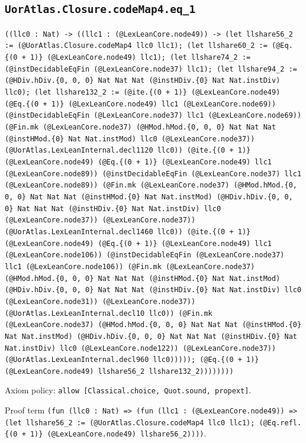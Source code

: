 \documentclass[11pt]{article}
\begin{document}
\subsection*{\texttt{UorAtlas.Closure.codeMap4.eq\_1}}
\noindent\texttt{((llc0 : Nat) -> ((llc1 : (@LexLeanCore.node49)) -> (let llshare56\_2 := (@UorAtlas.Closure.codeMap4 llc0 llc1); (let llshare60\_2 := (@Eq.\{(0 + 1)\} (@LexLeanCore.node49) llc1); (let llshare74\_2 := (@instDecidableEqFin (@LexLeanCore.node37) llc1); (let llshare94\_2 := (@HDiv.hDiv.\{0, 0, 0\} Nat Nat Nat (@instHDiv.\{0\} Nat Nat.instDiv) llc0); (let llshare132\_2 := (@ite.\{(0 + 1)\} (@LexLeanCore.node49) (@Eq.\{(0 + 1)\} (@LexLeanCore.node49) llc1 (@LexLeanCore.node69)) (@instDecidableEqFin (@LexLeanCore.node37) llc1 (@LexLeanCore.node69)) (@Fin.mk (@LexLeanCore.node37) (@HMod.hMod.\{0, 0, 0\} Nat Nat Nat (@instHMod.\{0\} Nat Nat.instMod) llc0 (@LexLeanCore.node37)) (@UorAtlas.LexLeanInternal.decl1120 llc0)) (@ite.\{(0 + 1)\} (@LexLeanCore.node49) (@Eq.\{(0 + 1)\} (@LexLeanCore.node49) llc1 (@LexLeanCore.node89)) (@instDecidableEqFin (@LexLeanCore.node37) llc1 (@LexLeanCore.node89)) (@Fin.mk (@LexLeanCore.node37) (@HMod.hMod.\{0, 0, 0\} Nat Nat Nat (@instHMod.\{0\} Nat Nat.instMod) (@HDiv.hDiv.\{0, 0, 0\} Nat Nat Nat (@instHDiv.\{0\} Nat Nat.instDiv) llc0 (@LexLeanCore.node37)) (@LexLeanCore.node37)) (@UorAtlas.LexLeanInternal.decl1460 llc0)) (@ite.\{(0 + 1)\} (@LexLeanCore.node49) (@Eq.\{(0 + 1)\} (@LexLeanCore.node49) llc1 (@LexLeanCore.node106)) (@instDecidableEqFin (@LexLeanCore.node37) llc1 (@LexLeanCore.node106)) (@Fin.mk (@LexLeanCore.node37) (@HMod.hMod.\{0, 0, 0\} Nat Nat Nat (@instHMod.\{0\} Nat Nat.instMod) (@HDiv.hDiv.\{0, 0, 0\} Nat Nat Nat (@instHDiv.\{0\} Nat Nat.instDiv) llc0 (@LexLeanCore.node31)) (@LexLeanCore.node37)) (@UorAtlas.LexLeanInternal.decl10 llc0)) (@Fin.mk (@LexLeanCore.node37) (@HMod.hMod.\{0, 0, 0\} Nat Nat Nat (@instHMod.\{0\} Nat Nat.instMod) (@HDiv.hDiv.\{0, 0, 0\} Nat Nat Nat (@instHDiv.\{0\} Nat Nat.instDiv) llc0 (@LexLeanCore.node122)) (@LexLeanCore.node37)) (@UorAtlas.LexLeanInternal.decl960 llc0))))); (@Eq.\{(0 + 1)\} (@LexLeanCore.node49) llshare56\_2 llshare132\_2))))))))}\par
\noindent Axiom policy: \texttt{allow [Classical.choice, Quot.sound, propext]}.\par
\noindent Proof term \texttt{(fun (llc0 : Nat) => (fun (llc1 : (@LexLeanCore.node49)) => (let llshare56\_2 := (@UorAtlas.Closure.codeMap4 llc0 llc1); (@Eq.refl.\{(0 + 1)\} (@LexLeanCore.node49) llshare56\_2))))}.\par
\end{document}
